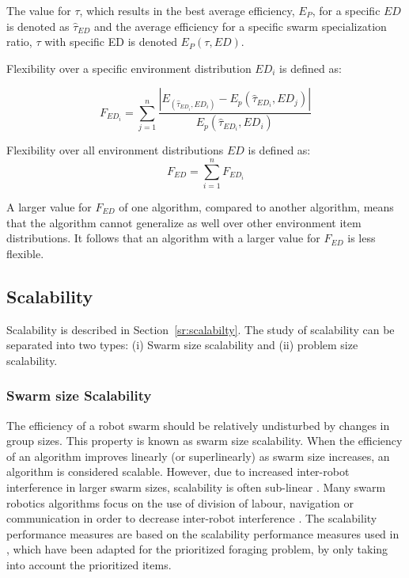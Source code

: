 The value for $\tau$, which results in the best average efficiency, $E_P$, for a specific $ED$ is denoted as $\hat{\tau}_{ED}$ and the average efficiency for a specific swarm specialization ratio, $\tau$ with specific ED is denoted $E_P(\tau, ED)$.

Flexibility over a specific environment distribution $ED_i$ is defined as:

\begin{equation}
F_{ED_i} = \sum_{j=1}^{n} \dfrac{|E_(\hat{\tau}_{ED_i}, ED_i)-E_p(\hat{\tau}_{ED_i}, ED_j)|}{E_p(\hat{\tau}_{ED_i}, ED_i)}
\end{equation}

Flexibility over all environment distributions $ED$ is defined as:
\begin{equation}
	F_{ED} = \sum_{i=1}^{n} F_{ED_i}
\end{equation}

A larger value for $F_{ED}$ of one algorithm, compared to another algorithm, means that the algorithm cannot generalize as well over other environment item distributions. It follows that an algorithm with a larger value for $F_{ED}$ is less flexible.

\subsection{Scalability}
\label{setup:scalability}

Scalability is described in Section~\ref{sr:scalabilty}. The study of scalability can be separated into two types: (i) Swarm size scalability and (ii) problem size scalability.

\subsubsection{Swarm size Scalability}
\label{swarmsizescalability}
The efficiency of a robot swarm should be relatively undisturbed by changes in group sizes. This property is known as swarm size scalability. When the efficiency of an algorithm improves linearly (or superlinearly) as swarm size increases, an algorithm is considered scalable. However, due to increased inter-robot interference in larger swarm sizes, scalability is often sub-linear \cite{lerman2002mathematical}. Many swarm robotics algorithms focus on the use of division of labour, navigation or communication in order to decrease inter-robot interference \cite{lerman2002mathematical, schneider1998territorial}. The scalability performance measures are based on the scalability performance measures used in \cite{hecker2015beyond}, which have been adapted for the prioritized foraging problem, by only taking into account the prioritized items.

